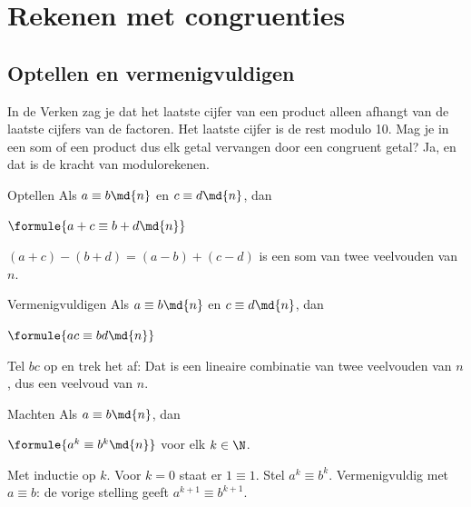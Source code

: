 \section{Rekenen met congruenties}

\subsection{Optellen en vermenigvuldigen}

In de Verken zag je dat het laatste cijfer van een product alleen afhangt van de laatste cijfers van de factoren. Het laatste cijfer is de rest modulo 10. Mag je in een som of een product dus elk getal vervangen door een congruent getal? Ja, en dat is de kracht van modulorekenen.

\begin{theorie}
\begin{stelling}{Optellen}
Als $a \equiv b \md{n}$ en $c \equiv d \md{n}$, dan

\vspace{1mm}
\qquad $\formule{a + c \equiv b + d \md{n}}$
\end{stelling}

\begin{bewijs}
$(a + c) - (b + d) = (a - b) + (c - d)$ is een som van twee veelvouden van $n$.
\end{bewijs}
\end{theorie}

\begin{theorie}
\begin{stelling}{Vermenigvuldigen}
Als $a \equiv b \md{n}$ en $c \equiv d \md{n}$, dan

\vspace{1mm}
\qquad $\formule{ac \equiv bd \md{n}}$
\end{stelling}

\begin{bewijs}
Tel $bc$ op en trek het af:
Dat is een lineaire combinatie van twee veelvouden van $n$, dus een veelvoud van $n$.
\end{bewijs}
\end{theorie}

\begin{theorie}
\begin{stelling}{Machten}
Als $a \equiv b \md{n}$, dan

\vspace{1mm}
\qquad $\formule{a^k \equiv b^k \md{n}}$ \qquad voor elk $k \in \N$.
\end{stelling}

\begin{bewijs}
Met inductie op $k$. Voor $k = 0$ staat er $1 \equiv 1$. Stel $a^k \equiv b^k$. Vermenigvuldig met $a \equiv b$: de vorige stelling geeft $a^{k + 1} \equiv b^{k + 1}$.
\end{bewijs}
\end{theorie}

